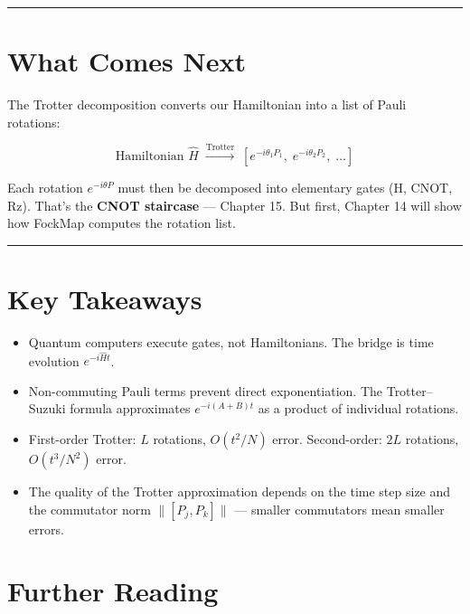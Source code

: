 \documentclass[
  11pt,
  oneside]{book}
\providecommand{\tightlist}{%
  \setlength{\itemsep}{0pt}\setlength{\parskip}{0pt}}
\begin{document}
\begin{center}\rule{0.5\linewidth}{0.5pt}\end{center}

\section{What Comes Next}\label{what-comes-next}

The Trotter decomposition converts our Hamiltonian into a list of Pauli
rotations:

\[\text{Hamiltonian } \hat{H} \;\xrightarrow{\text{Trotter}}\; [e^{-i\theta_1 P_1},\; e^{-i\theta_2 P_2},\; \ldots]\]

Each rotation \(e^{-i\theta P}\) must then be decomposed into elementary
gates (H, CNOT, Rz). That's the \textbf{CNOT staircase} --- Chapter 15.
But first, Chapter 14 will show how FockMap computes the rotation list.

\begin{center}\rule{0.5\linewidth}{0.5pt}\end{center}

\section{Key Takeaways}\label{key-takeaways-13}

\begin{itemize}
\tightlist
\item
  Quantum computers execute gates, not Hamiltonians. The bridge is time
  evolution \(e^{-i\hat{H}t}\).
\item
  Non-commuting Pauli terms prevent direct exponentiation. The
  Trotter--Suzuki formula approximates \(e^{-i(A+B)t}\) as a product of
  individual rotations.
\item
  First-order Trotter: \(L\) rotations, \(O(t^2/N)\) error.
  Second-order: \(2L\) rotations, \(O(t^3/N^2)\) error.
\item
  The quality of the Trotter approximation depends on the time step size
  and the commutator norm \(\lVert[P_j, P_k]\rVert\) --- smaller
  commutators mean smaller errors.
\end{itemize}

\section{Further Reading}\label{further-reading-11}
\end{document}
